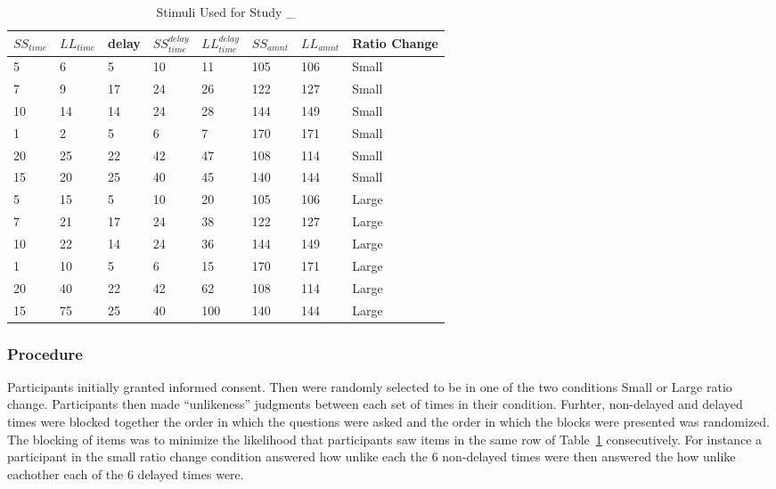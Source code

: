 \documentclass[]{article}
\begin{document}
\begin{table}[!htbp] \centering 
	\caption{Stimuli Used for Study \_ } \label{tab:stimuli}
\begin{tabular}{ | l | l | l | l | l | l | l | l | }
	\hline
	$SS_{time}$ & $LL_{time}$ & delay & $SS_{time}^{delay}$ & $LL_{time}^{delay}$ & $SS_{amnt}$ & $LL_{amnt}$ & Ratio Change \\ \hline
	5 & 6 & 5 & 10 & 11 & 105 & 106 & Small  \\ \hline
	7 & 9 & 17 & 24 & 26 & 122 & 127 & Small  \\ \hline
	10 & 14 & 14 & 24 & 28 & 144 & 149 & Small  \\ \hline
	1 & 2 & 5 & 6 & 7 & 170 & 171 & Small  \\ \hline
	20 & 25 & 22 & 42 & 47 & 108 & 114 & Small  \\ \hline
	15 & 20 & 25 & 40 & 45 & 140 & 144 & Small  \\ \hline
	5 & 15 & 5 & 10 & 20 & 105 & 106 & Large \\ \hline
	7 & 21 & 17 & 24 & 38 & 122 & 127 & Large \\ \hline
	10 & 22 & 14 & 24 & 36 & 144 & 149 & Large \\ \hline
	1 & 10 & 5 & 6 & 15 & 170 & 171 & Large \\ \hline
	20 & 40 & 22 & 42 & 62 & 108 & 114 & Large \\ \hline
	15 & 75 & 25 & 40 & 100 & 140 & 144 & Large \\ \hline
\end{tabular}
\end{table}

\subsubsection{Procedure}

Participants initially granted informed consent. 
Then were randomly selected to be in one of the two conditions Small or Large ratio change. 
Participants then made ``unlikeness'' judgments between each set of times in their condition. 
Furhter, non-delayed and delayed times were blocked together the order in which the questions were asked and the order in which the blocks were presented was randomized. 
The blocking of items was to minimize the likelihood that participants saw items in the same row of Table~\ref{tab:stimuli} consecutively. 
For instance a participant in the small ratio change condition answered how unlike each  the 6 non-delayed times were then answered the how unlike eachother each of the 6 delayed times were. 
\end{document}

